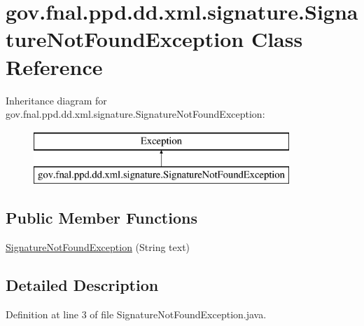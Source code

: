 \hypertarget{classgov_1_1fnal_1_1ppd_1_1dd_1_1xml_1_1signature_1_1SignatureNotFoundException}{\section{gov.\-fnal.\-ppd.\-dd.\-xml.\-signature.\-Signature\-Not\-Found\-Exception Class Reference}
\label{classgov_1_1fnal_1_1ppd_1_1dd_1_1xml_1_1signature_1_1SignatureNotFoundException}
}
Inheritance diagram for gov.\-fnal.\-ppd.\-dd.\-xml.\-signature.\-Signature\-Not\-Found\-Exception\-:\begin{figure}[H]
\begin{center}
\leavevmode
\includegraphics[height=2.000000cm]{classgov_1_1fnal_1_1ppd_1_1dd_1_1xml_1_1signature_1_1SignatureNotFoundException}
\end{center}
\end{figure}
\subsection*{Public Member Functions}
\begin{DoxyCompactItemize}
\item 
\hyperlink{classgov_1_1fnal_1_1ppd_1_1dd_1_1xml_1_1signature_1_1SignatureNotFoundException_af80eae7d40d4d237e1f236753ce468e5}{Signature\-Not\-Found\-Exception} (String text)
\end{DoxyCompactItemize}


\subsection{Detailed Description}


Definition at line 3 of file Signature\-Not\-Found\-Exception.\-java.



